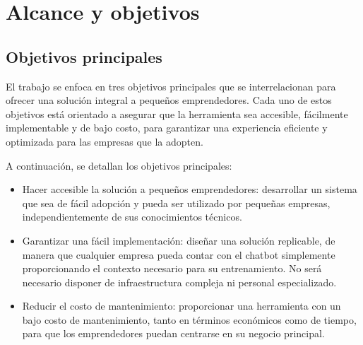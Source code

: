 \section{Alcance y objetivos{}}

\subsection{Objetivos principales}

El trabajo se enfoca en tres objetivos principales que se interrelacionan para ofrecer una solución integral a pequeños emprendedores. Cada uno de estos objetivos está orientado a asegurar que la herramienta sea accesible, fácilmente implementable y de bajo costo, para garantizar una experiencia eficiente y optimizada para las empresas que la adopten. 
 
A continuación, se detallan los objetivos principales:


\begin{itemize}
    \item Hacer accesible la solución a pequeños emprendedores: desarrollar un sistema que sea de fácil adopción y pueda ser utilizado por pequeñas empresas, independientemente de sus conocimientos técnicos.
    
    \item Garantizar una fácil implementación: diseñar una solución replicable, de manera que cualquier empresa pueda contar con el chatbot simplemente proporcionando el contexto necesario para su entrenamiento. No será necesario disponer de infraestructura compleja ni personal especializado.
    
    \item Reducir el costo de mantenimiento: proporcionar una herramienta con un bajo costo de mantenimiento, tanto en términos económicos como de tiempo, para que los emprendedores puedan centrarse en su negocio principal.
    
\end{itemize}



